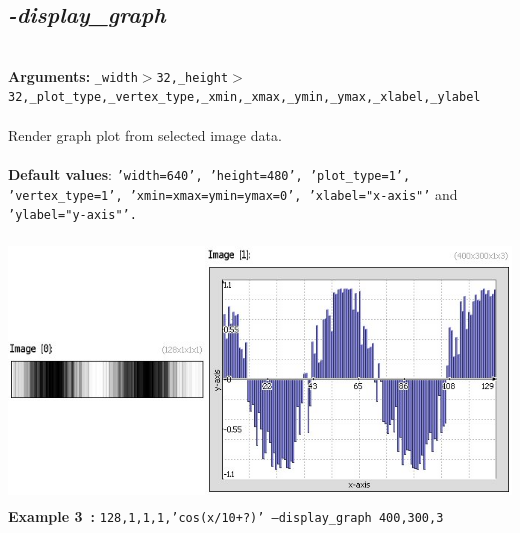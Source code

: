 \documentclass[a4paper,11pt,twoside]{book}
\begin{document}
\subsection{\emph{-display\_graph} }\vspace*{-0.5em}
~\\\textbf{Arguments: } 
{\small \texttt{\_width$>$32,\_height$>$32,\_plot\_type,\_vertex\_type,\_xmin,\_xmax,\_ymin,\_ymax,\_xlabel,\_ylabel}}\\~\\
Render graph plot from selected image data.
~\\~\\\textbf{Default values}: {\small \texttt{'width=640', 'height=480', 'plot\_type=1', 'vertex\_type=1', 'xmin=xmax=ymin=ymax=0', 'xlabel="x-axis"'} and \texttt{'ylabel="y-axis"'.}}
\begin{center}\includegraphics[keepaspectratio=true,height=7cm,width=\textwidth]{img/gmic_def3.jpg}\\
{\footnotesize \textbf{Example 3~:} \texttt{128,1,1,1,'cos(x/10+?)' --display\_graph 400,300,3}}
\end{center}
\end{document}
